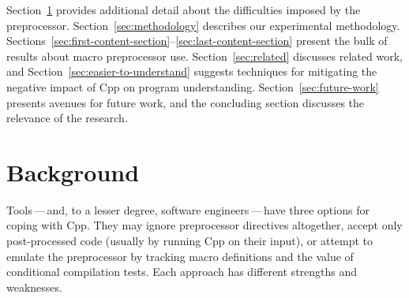\documentclass[10pt]{article}
\begin{document}
%
%

Section~\ref{sec:background} provides additional detail about the
difficulties imposed by the preprocessor.
Section~\ref{sec:methodology} describes our experimental methodology.
Sections~\ref{sec:first-content-section}--\ref{sec:last-content-section}
present the bulk of results about macro preprocessor use.
Section~\ref{sec:related} discusses related work, and
Section~\ref{sec:easier-to-understand} suggests techniques for mitigating
the negative impact of Cpp on program understanding.
Section~\ref{sec:future-work} presents avenues for future work, and the
concluding section discusses the relevance of the research.


\section{Background}\label{sec:background}

Tools\,---\,and, to a lesser degree, software engineers\,---\,have
three options for coping with Cpp.  They may ignore preprocessor
directives altogether, accept only post-processed code (usually by
running Cpp on their input), or attempt to emulate the preprocessor by
tracking macro definitions and the value of conditional compilation tests.
Each approach has different strengths and weaknesses.
\end{document}
